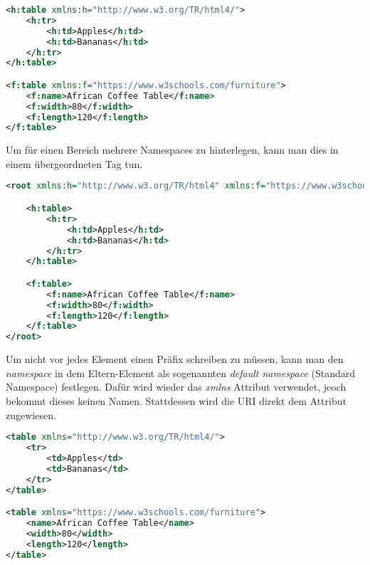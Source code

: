 \begin{lstlisting}[title=Verwendung von \textit{namespaces} Möglichkeit 1, language=XML, morekeywords={h:table, xmlns:h, h:tr, h:td, f:table, xmlns:f, f:name, f:width, f:length}]
<h:table xmlns:h="http://www.w3.org/TR/html4/">
	<h:tr>
		<h:td>Apples</h:td>
		<h:td>Bananas</h:td>
	</h:tr>
</h:table>

<f:table xmlns:f="https://www.w3schools.com/furniture">
	<f:name>African Coffee Table</f:name>
	<f:width>80</f:width>
	<f:length>120</f:length>
</f:table>
\end{lstlisting}

Um für einen Bereich mehrere Namespaces zu hinterlegen, kann man dies in einem übergeordneten Tag tun. \\

\begin{lstlisting}[title=Verwendung von \textit{namespaces} Möglichkeit 2, language=XML, morekeywords={h:table, xmlns:h, h:tr, h:td, f:table, xmlns:f, f:name, f:width, f:length, root}]
<root xmlns:h="http://www.w3.org/TR/html4" xmlns:f="https://www.w3schools.com/furniture">

	<h:table>
		<h:tr>
			<h:td>Apples</h:td>
			<h:td>Bananas</h:td>
		</h:tr>
	</h:table>

	<f:table>
		<f:name>African Coffee Table</f:name>
		<f:width>80</f:width>
		<f:length>120</f:length>
	</f:table>
</root>
\end{lstlisting}

Um nicht vor jedes Element einen Präfix schreiben zu müssen, kann man den \textit{namespace} in dem Eltern-Element als sogenannten \textit{default namespace} (Standard Namespace) festlegen. Dafür wird wieder das \textit{xmlns} Attribut verwendet, jeoch bekommt dieses keinen Namen. Stattdessen wird die \ac{URI} direkt dem Attribut zugewiesen. \\

\begin{lstlisting}[title=Verwendung von \textit{namespaces} Möglichkeit 3, language=XML, morekeywords={h:table, xmlns, tr, td, table, xmlns, name, width, length}]
<table xmlns="http://www.w3.org/TR/html4/">
	<tr>
		<td>Apples</td>
		<td>Bananas</td>
	</tr>
</table> 

<table xmlns="https://www.w3schools.com/furniture">
	<name>African Coffee Table</name>
	<width>80</width>
	<length>120</length>
</table>
\end{lstlisting}

